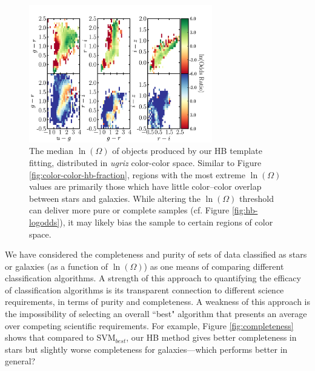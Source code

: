 \documentclass[12pt,preprint]{aastex}
\begin{document}
\begin{figure}
\centering
 \includegraphics[clip=true, trim=0cm 0cm 0.0cm 0.cm,width=8cm]{fig8.pdf}
\caption{The median $\ln(\Omega)$ of objects produced by our HB
  template fitting, distributed in {\it ugriz} color-color space.
  Similar to Figure \ref{fig:color-color-hb-fraction}, regions with
  the most extreme $\ln(\Omega)$ values are primarily those which have
  little color--color overlap between stars and galaxies.  While
  altering the $\ln(\Omega)$ threshold can deliver more pure or
  complete samples (cf. Figure \ref{fig:hb-logodds}), it may likely
  bias the sample to certain regions of color space.}
\label{fig:color-color-hb-odds}
\end{figure}


We have considered the completeness and purity of sets of data
classified as stars or galaxies (as a function of $\ln(\Omega)$) as
one means of comparing different classification algorithms.  A
strength of this approach to quantifying the efficacy of
classification algorithms is its transparent connection to different
science requirements, in terms of purity and completeness.  A weakness
of this approach is the impossibility of selecting an overall ``best"
algorithm that presents an average over competing scientific
requirements.  For example, Figure \ref{fig:completeness} shows that
compared to SVM$_{best}$, our HB method gives better completeness in
stars but slightly worse completeness for galaxies---which performs
better in general?
\end{document}

